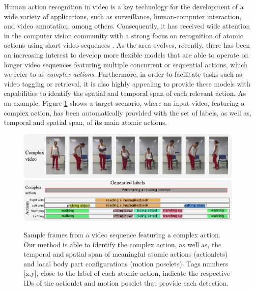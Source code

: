 Human action recognition in video is a key technology for the development of a
wide variety of applications, such as surveillance, human-computer interaction,
and video annotation, among others. Consequently, it has received wide attention
in the computer vision community with a strong focus on recognition of atomic
actions using short video sequences
\cite{Aggarwal2011,vishwakarma2013survey,weinland2011survey}. As the area
evolves, recently, there has been an increasing interest to develop more
flexible models that are able to operate on longer video sequences featuring
multiple concurrent or sequential actions, which we refer to as
\textit{complex actions}. Furthermore, in order to facilitate tasks such as
video tagging or retrieval, it is also highly appealing to provide these models
with capabilities to identify the spatial and temporal span of each relevant
action. As an example, Figure \ref{fig:frontfigure} shows a target scenario,
where an input video, featuring a complex action, has been automatically
provided with the set of labels, as well as, temporal and
spatial span, of its main atomic actions.

\begin{figure}[t]
\begin{center} \label{fig:frontfigure}
\includegraphics[width=0.98\linewidth]{Fig/portada.pdf}
\vspace{-0.5cm}
\end{center}
\caption{Sample frames from a video sequence featuring a complex action. 
Our method is able to identify the complex action, as well as, the temporal and 
spatial span of meaningful atomic actions (actionlets) and local body part 
configurations (motion poselets). Tags numbers [x,y], close to the label of 
each atomic action, indicate the respective IDs of the actionlet and motion 
poselet that provide each detection.}
\vspace{-0.5cm}
\end{figure}

